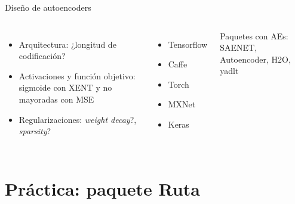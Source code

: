 \begin{frame}{Diseño de autoencoders}
\begin{columns}[t]

\begin{itemize}
\item Arquitectura: ¿longitud de codificación?
\item Activaciones y función objetivo: sigmoide con XENT y no mayoradas con MSE
\item Regularizaciones: \emph{weight decay}?, \emph{sparsity}?
\end{itemize}


\begin{itemize}
\item Tensorflow
\item Caffe
\item Torch
\item MXNet
\item \alert{Keras}
\end{itemize}

Paquetes con AEs: SAENET, Autoencoder, H2O, yadlt

\end{columns}
\end{frame}




\section{Práctica: paquete Ruta}\subsection*{}


